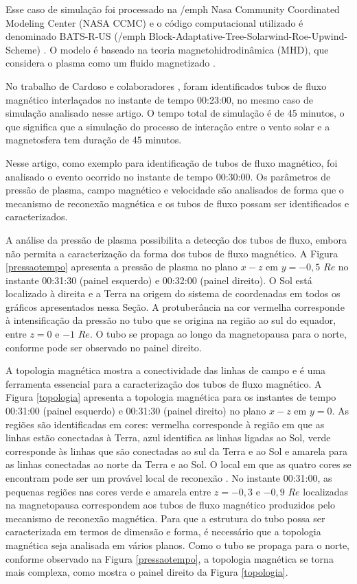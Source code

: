 Esse caso de simulação foi processado na {/emph Nasa Community Coordinated Modeling Center} (NASA CCMC) e o código computacional utilizado é denominado BATS-R-US ({/emph Block-Adaptative-Tree-Solarwind-Roe-Upwind-Scheme}) \cite{toth05,gombosi2004,powell99}. O modelo é baseado na teoria magnetohidrodinâmica (MHD), que considera o plasma como um fluido magnetizado \cite{bittencourt,baumjohann1996}.

No trabalho de Cardoso e colaboradores \cite{cardoso2013}, foram identificados tubos de fluxo magnético interlaçados no instante de tempo 00:23:00, no mesmo caso de simulação analisado nesse artigo. O tempo total de simulação é de 45 minutos, o que significa que a simulação do processo de interação entre o vento solar e a magnetosfera tem duração de 45 minutos. 

Nesse artigo, como exemplo para identificação de tubos de fluxo magnético, foi analisado o evento ocorrido no instante de tempo 00:30:00. Os parâmetros de pressão de plasma, campo magnético e velocidade são analisados de forma que o mecanismo de reconexão magnética e os tubos de fluxo possam ser identificados e caracterizados. 

A análise da pressão de plasma possibilita a detecção dos tubos de fluxo, embora não permita a caracterização da forma dos tubos de fluxo magnético. A Figura \ref{pressaotempo} apresenta a pressão de plasma no plano $x-z$ em $y= -0,5$ $Re$ no instante 00:31:30 (painel esquerdo) e 00:32:00 (painel direito). O Sol está localizado à direita e a Terra na origem do sistema de coordenadas em todos os gráficos apresentados nessa Seção. A protuberância na cor vermelha corresponde à intensificação da pressão no tubo que se origina na região ao sul do equador, entre $z= 0$ e $-1$ $Re$. O tubo se propaga ao longo da magnetopausa para o norte, conforme pode ser observado no painel direito. 

A topologia magnética mostra a conectividade das linhas de campo e é uma ferramenta essencial para a caracterização dos tubos de fluxo magnético. A Figura \ref{topologia} apresenta a topologia magnética para os instantes de tempo 00:31:00 (painel esquerdo) e 00:31:30 (painel direito) no plano $x-z$ em $y= 0$. As regiões são identificadas em cores: vermelha corresponde à região em que as linhas estão conectadas à Terra, azul identifica as linhas ligadas ao Sol, verde corresponde às linhas que são conectadas ao sul da Terra e ao Sol e amarela para as linhas conectadas ao norte da Terra e ao Sol. O local em que as quatro cores se encontram pode ser um provável local de reconexão \cite{cardoso2013,dorelli09,raeder06}. No instante 00:31:00, as pequenas regiões nas cores verde e amarela entre $z= - 0,3$ e $-0,9$ $Re$ localizadas na magnetopausa correspondem aos tubos de fluxo magnético produzidos pelo mecanismo de reconexão magnética. Para que a estrutura do tubo possa ser caracterizada em termos de dimensão e forma, é necessário que a topologia magnética seja analisada em vários planos. Como o tubo se propaga para o norte, conforme observado na Figura \ref{pressaotempo}, a topologia magnética se torna mais complexa, como mostra o painel direito da Figura \ref{topologia}.

